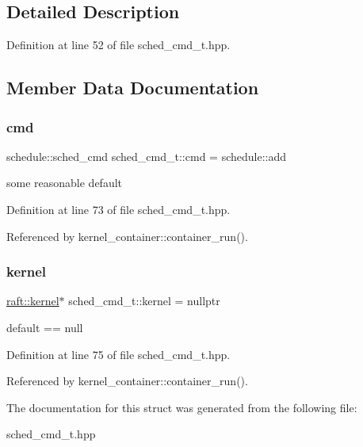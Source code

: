 \subsection{Detailed Description}


Definition at line 52 of file sched\+\_\+cmd\+\_\+t.\+hpp.



\subsection{Member Data Documentation}
\hypertarget{structsched__cmd__t_ab4ecf8a7b468db75074c0ba1493caac7}{}\label{structsched__cmd__t_ab4ecf8a7b468db75074c0ba1493caac7} 
\subsubsection{\texorpdfstring{cmd}{cmd}}
{\footnotesize\ttfamily schedule\+::sched\+\_\+cmd sched\+\_\+cmd\+\_\+t\+::cmd = schedule\+::add}

some reasonable default 

Definition at line 73 of file sched\+\_\+cmd\+\_\+t.\+hpp.



Referenced by kernel\+\_\+container\+::container\+\_\+run().

\hypertarget{structsched__cmd__t_a8f78af789430b7661f52de7365abcdbc}{}\label{structsched__cmd__t_a8f78af789430b7661f52de7365abcdbc} 
\subsubsection{\texorpdfstring{kernel}{kernel}}
{\footnotesize\ttfamily \hyperlink{classraft_1_1kernel}{raft\+::kernel}$\ast$ sched\+\_\+cmd\+\_\+t\+::kernel = nullptr}

default == null 

Definition at line 75 of file sched\+\_\+cmd\+\_\+t.\+hpp.



Referenced by kernel\+\_\+container\+::container\+\_\+run().



The documentation for this struct was generated from the following file\+:\begin{DoxyCompactItemize}
\item 
sched\+\_\+cmd\+\_\+t.\+hpp\end{DoxyCompactItemize}
